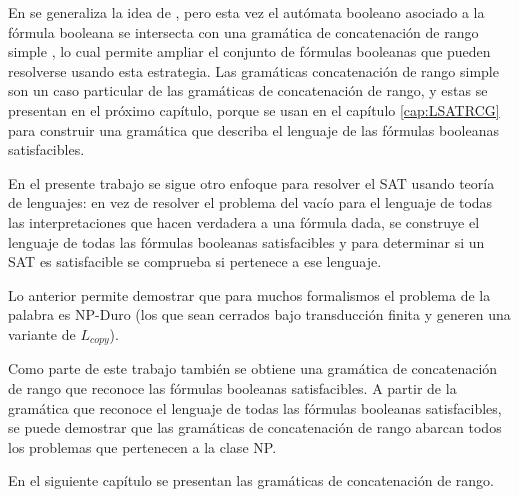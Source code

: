 \documentclass[12pt]{article}
\begin{document}
En \cite{aSRCSAT} se generaliza la idea de \cite{aCFSAT}, pero esta vez el autómata booleano asociado a la fórmula booleana se intersecta con una gramática de concatenación de rango simple \cite{mainRCGBib}, lo cual permite ampliar el conjunto de fórmulas booleanas que pueden resolverse usando esta estrategia. Las gramáticas concatenación de rango simple son un caso particular de las gramáticas de concatenación de rango, y estas se presentan en el próximo capítulo, porque se usan en el capítulo \ref{cap:LSATRCG} para construir una gramática que 
describa el lenguaje de las fórmulas booleanas satisfacibles.

En el presente trabajo se sigue otro enfoque para resolver el SAT usando teoría de lenguajes: en vez de resolver el problema del vacío para el lenguaje de todas las interpretaciones que hacen verdadera a una fórmula dada, se construye el lenguaje de todas las fórmulas booleanas satisfacibles y para determinar si un SAT es satisfacible se comprueba si pertenece a ese lenguaje.

Lo anterior permite demostrar que para muchos formalismos el problema de la palabra es NP-Duro (los que sean cerrados bajo transducción finita y generen una variante de $L_{copy}$).

Como parte de este trabajo también se obtiene una gramática de concatenación de rango que reconoce las fórmulas booleanas satisfacibles. A partir de la gramática que reconoce el lenguaje de todas las fórmulas booleanas satisfacibles, se puede demostrar que las gramáticas de concatenación de rango abarcan todos los problemas que pertenecen a la clase NP.

En el siguiente capítulo se presentan las gramáticas de concatenación de rango.
\end{document}
